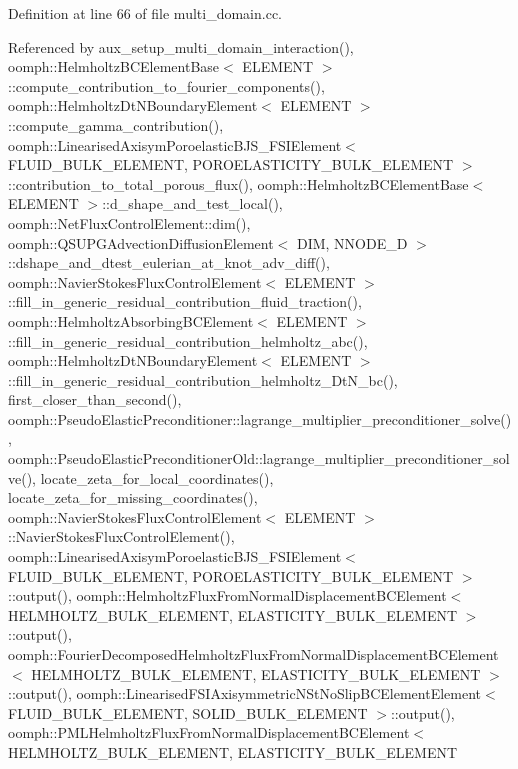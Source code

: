 Definition at line 66 of file multi\+\_\+domain.\+cc.



Referenced by aux\+\_\+setup\+\_\+multi\+\_\+domain\+\_\+interaction(), oomph\+::\+Helmholtz\+B\+C\+Element\+Base$<$ E\+L\+E\+M\+E\+N\+T $>$\+::compute\+\_\+contribution\+\_\+to\+\_\+fourier\+\_\+components(), oomph\+::\+Helmholtz\+Dt\+N\+Boundary\+Element$<$ E\+L\+E\+M\+E\+N\+T $>$\+::compute\+\_\+gamma\+\_\+contribution(), oomph\+::\+Linearised\+Axisym\+Poroelastic\+B\+J\+S\+\_\+\+F\+S\+I\+Element$<$ F\+L\+U\+I\+D\+\_\+\+B\+U\+L\+K\+\_\+\+E\+L\+E\+M\+E\+N\+T, P\+O\+R\+O\+E\+L\+A\+S\+T\+I\+C\+I\+T\+Y\+\_\+\+B\+U\+L\+K\+\_\+\+E\+L\+E\+M\+E\+N\+T $>$\+::contribution\+\_\+to\+\_\+total\+\_\+porous\+\_\+flux(), oomph\+::\+Helmholtz\+B\+C\+Element\+Base$<$ E\+L\+E\+M\+E\+N\+T $>$\+::d\+\_\+shape\+\_\+and\+\_\+test\+\_\+local(), oomph\+::\+Net\+Flux\+Control\+Element\+::dim(), oomph\+::\+Q\+S\+U\+P\+G\+Advection\+Diffusion\+Element$<$ D\+I\+M, N\+N\+O\+D\+E\+\_\+D $>$\+::dshape\+\_\+and\+\_\+dtest\+\_\+eulerian\+\_\+at\+\_\+knot\+\_\+adv\+\_\+diff(), oomph\+::\+Navier\+Stokes\+Flux\+Control\+Element$<$ E\+L\+E\+M\+E\+N\+T $>$\+::fill\+\_\+in\+\_\+generic\+\_\+residual\+\_\+contribution\+\_\+fluid\+\_\+traction(), oomph\+::\+Helmholtz\+Absorbing\+B\+C\+Element$<$ E\+L\+E\+M\+E\+N\+T $>$\+::fill\+\_\+in\+\_\+generic\+\_\+residual\+\_\+contribution\+\_\+helmholtz\+\_\+abc(), oomph\+::\+Helmholtz\+Dt\+N\+Boundary\+Element$<$ E\+L\+E\+M\+E\+N\+T $>$\+::fill\+\_\+in\+\_\+generic\+\_\+residual\+\_\+contribution\+\_\+helmholtz\+\_\+\+Dt\+N\+\_\+bc(), first\+\_\+closer\+\_\+than\+\_\+second(), oomph\+::\+Pseudo\+Elastic\+Preconditioner\+::lagrange\+\_\+multiplier\+\_\+preconditioner\+\_\+solve(), oomph\+::\+Pseudo\+Elastic\+Preconditioner\+Old\+::lagrange\+\_\+multiplier\+\_\+preconditioner\+\_\+solve(), locate\+\_\+zeta\+\_\+for\+\_\+local\+\_\+coordinates(), locate\+\_\+zeta\+\_\+for\+\_\+missing\+\_\+coordinates(), oomph\+::\+Navier\+Stokes\+Flux\+Control\+Element$<$ E\+L\+E\+M\+E\+N\+T $>$\+::\+Navier\+Stokes\+Flux\+Control\+Element(), oomph\+::\+Linearised\+Axisym\+Poroelastic\+B\+J\+S\+\_\+\+F\+S\+I\+Element$<$ F\+L\+U\+I\+D\+\_\+\+B\+U\+L\+K\+\_\+\+E\+L\+E\+M\+E\+N\+T, P\+O\+R\+O\+E\+L\+A\+S\+T\+I\+C\+I\+T\+Y\+\_\+\+B\+U\+L\+K\+\_\+\+E\+L\+E\+M\+E\+N\+T $>$\+::output(), oomph\+::\+Helmholtz\+Flux\+From\+Normal\+Displacement\+B\+C\+Element$<$ H\+E\+L\+M\+H\+O\+L\+T\+Z\+\_\+\+B\+U\+L\+K\+\_\+\+E\+L\+E\+M\+E\+N\+T, E\+L\+A\+S\+T\+I\+C\+I\+T\+Y\+\_\+\+B\+U\+L\+K\+\_\+\+E\+L\+E\+M\+E\+N\+T $>$\+::output(), oomph\+::\+Fourier\+Decomposed\+Helmholtz\+Flux\+From\+Normal\+Displacement\+B\+C\+Element$<$ H\+E\+L\+M\+H\+O\+L\+T\+Z\+\_\+\+B\+U\+L\+K\+\_\+\+E\+L\+E\+M\+E\+N\+T, E\+L\+A\+S\+T\+I\+C\+I\+T\+Y\+\_\+\+B\+U\+L\+K\+\_\+\+E\+L\+E\+M\+E\+N\+T $>$\+::output(), oomph\+::\+Linearised\+F\+S\+I\+Axisymmetric\+N\+St\+No\+Slip\+B\+C\+Element\+Element$<$ F\+L\+U\+I\+D\+\_\+\+B\+U\+L\+K\+\_\+\+E\+L\+E\+M\+E\+N\+T, S\+O\+L\+I\+D\+\_\+\+B\+U\+L\+K\+\_\+\+E\+L\+E\+M\+E\+N\+T $>$\+::output(), oomph\+::\+P\+M\+L\+Helmholtz\+Flux\+From\+Normal\+Displacement\+B\+C\+Element$<$ H\+E\+L\+M\+H\+O\+L\+T\+Z\+\_\+\+B\+U\+L\+K\+\_\+\+E\+L\+E\+M\+E\+N\+T, E\+L\+A\+S\+T\+I\+C\+I\+T\+Y\+\_\+\+B\+U\+L\+K\+\_\+\+E\+L\+E\+M\+E\+N\+T 